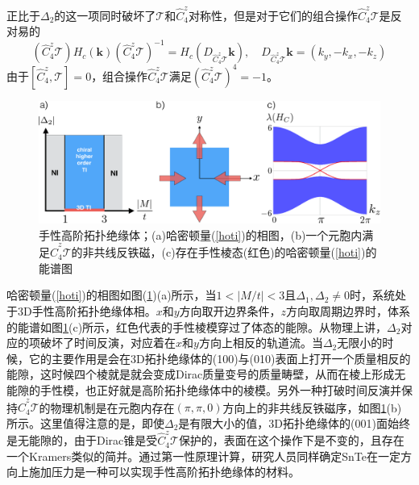 \qquad 正比于$\Delta_2$的这一项同时破坏了$\mathcal{T}$和$\hat{C}_4^z$对称性，但是对于它们的组合操作$\hat{C}_4^z\mathcal{T}$是反对易的
\begin{equation}
(\hat{C}_4^z\mathcal{T})H_c(\mathbf{k})(\hat{C}_4^z\mathcal{T})^{-1}=H_c(D_{\hat{C}_4^z\mathcal{T}}\mathbf{k}),\quad D_{\hat{C}_4^z\mathcal{T}}\mathbf{k}=(k_y,-k_x,-k_z)
\end{equation}
由于$\left[\hat{C}_4^z,\mathcal{T}\right]=0$，组合操作$\hat{C}_4^z\mathcal{T}$满足$(\hat{C}_4^z\mathcal{T})^4=-1$。
\begin{figure}[h]
\centering
\includegraphics[scale=0.7]{pic/fig7}
\caption{手性高阶拓扑绝缘体；(a)哈密顿量(\ref{hoti})的相图，(b)一个元胞内满足$\hat{C}_4^z\mathcal{T}$的非共线反铁磁，(c)存在手性棱态(红色)的哈密顿量(\ref{hoti})的能谱图}\label{fig7}
\end{figure}
哈密顿量(\ref{hoti})的相图如图(\ref{fig7})(a)所示，当$1<|M/t|<3$且$\Delta_1,\Delta_2\neq 0$时，系统处于3D手性高阶拓扑绝缘体相。$x$和$y$方向取开边界条件，$z$方向取周期边界时，体系的能谱如图\ref{fig7}(c)所示，红色代表的手性棱模穿过了体态的能隙。从物理上讲，$\Delta_2$对应的项破坏了时间反演，对应着在$x$和$y$方向上相反的轨道流。当$\Delta_2$无限小的时候，它的主要作用是会在3D拓扑绝缘体的(100)与(010)表面上打开一个质量相反的能隙，这时候四个棱就是就会变成Dirac质量变号的质量畴壁，从而在棱上形成无能隙的手性模，也正好就是高阶拓扑绝缘体中的棱模。另外一种打破时间反演并保持$\hat{C}_4^z\mathcal{T}$的物理机制是在元胞内存在$(\pi,\pi,0)$方向上的非共线反铁磁序，如图\ref{fig7}(b)所示。这里值得注意的是，即使$\Delta_2$是有限大小的值，3D拓扑绝缘体的(001)面始终是无能隙的，由于Dirac锥是受$\hat{C}_4^z\mathcal{T}$保护的，表面在这个操作下是不变的，且存在一个Kramers类似的简并。通过第一性原理计算，研究人员同样确定SnTe在一定方向上施加压力是一种可以实现手性高阶拓扑绝缘体的材料\cite{re23}。
